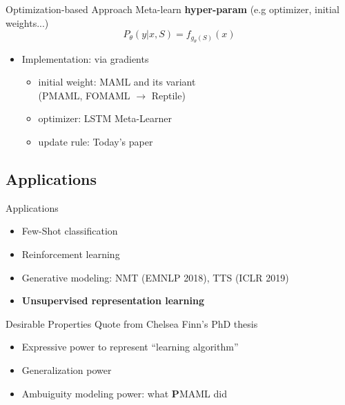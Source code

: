 \documentclass{beamer}
\begin{document}
\begin{frame}{Optimization-based Approach}
  Meta-learn \textbf{hyper-param} (e.g optimizer, initial weights...)
  \[ P_\theta(y|x,S) = f_{g_\theta(S)}(x) \]
  \begin{itemize}
    \item Implementation: via gradients 
      \begin{itemize}
        \item initial weight: MAML and its variant\\
          (PMAML, FOMAML $\rightarrow$ Reptile)
        \item optimizer: LSTM Meta-Learner
        \item update rule: Today's paper
      \end{itemize}
  \end{itemize}
\end{frame}

\subsection{Applications}

\begin{frame}{Applications}
  \begin{itemize}
    \item Few-Shot classification
    \item Reinforcement learning
    \item Generative modeling: NMT (EMNLP 2018), TTS (ICLR 2019)
    \item \textbf{Unsupervised representation learning}
  \end{itemize}
\end{frame}

\begin{frame}{Desirable Properties}
  Quote from Chelsea Finn's PhD thesis
  \begin{itemize}
    \item Expressive power to represent ``learning algorithm''
    \item Generalization power
    \item Ambuiguity modeling power: what \textbf{P}MAML did
  \end{itemize}
\end{frame}
\end{document}
